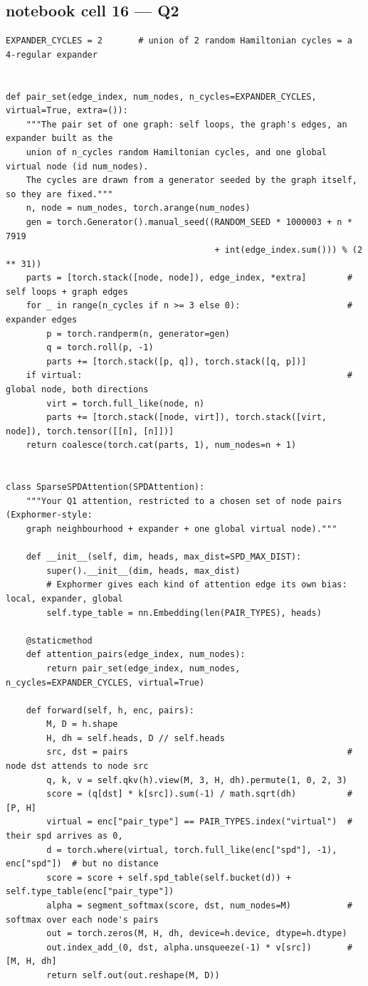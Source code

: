 \subsection*{notebook cell 16 — Q2}
\begin{lstlisting}[style=p1py]
EXPANDER_CYCLES = 2       # union of 2 random Hamiltonian cycles = a 4-regular expander


def pair_set(edge_index, num_nodes, n_cycles=EXPANDER_CYCLES, virtual=True, extra=()):
    """The pair set of one graph: self loops, the graph's edges, an expander built as the
    union of n_cycles random Hamiltonian cycles, and one global virtual node (id num_nodes).
    The cycles are drawn from a generator seeded by the graph itself, so they are fixed."""
    n, node = num_nodes, torch.arange(num_nodes)
    gen = torch.Generator().manual_seed((RANDOM_SEED * 1000003 + n * 7919
                                         + int(edge_index.sum())) % (2 ** 31))
    parts = [torch.stack([node, node]), edge_index, *extra]        # self loops + graph edges
    for _ in range(n_cycles if n >= 3 else 0):                     # expander edges
        p = torch.randperm(n, generator=gen)
        q = torch.roll(p, -1)
        parts += [torch.stack([p, q]), torch.stack([q, p])]
    if virtual:                                                    # global node, both directions
        virt = torch.full_like(node, n)
        parts += [torch.stack([node, virt]), torch.stack([virt, node]), torch.tensor([[n], [n]])]
    return coalesce(torch.cat(parts, 1), num_nodes=n + 1)


class SparseSPDAttention(SPDAttention):
    """Your Q1 attention, restricted to a chosen set of node pairs (Exphormer-style:
    graph neighbourhood + expander + one global virtual node)."""

    def __init__(self, dim, heads, max_dist=SPD_MAX_DIST):
        super().__init__(dim, heads, max_dist)
        # Exphormer gives each kind of attention edge its own bias: local, expander, global
        self.type_table = nn.Embedding(len(PAIR_TYPES), heads)

    @staticmethod
    def attention_pairs(edge_index, num_nodes):
        return pair_set(edge_index, num_nodes, n_cycles=EXPANDER_CYCLES, virtual=True)

    def forward(self, h, enc, pairs):
        M, D = h.shape
        H, dh = self.heads, D // self.heads
        src, dst = pairs                                           # node dst attends to node src
        q, k, v = self.qkv(h).view(M, 3, H, dh).permute(1, 0, 2, 3)
        score = (q[dst] * k[src]).sum(-1) / math.sqrt(dh)          # [P, H]
        virtual = enc["pair_type"] == PAIR_TYPES.index("virtual")  # their spd arrives as 0,
        d = torch.where(virtual, torch.full_like(enc["spd"], -1), enc["spd"])  # but no distance
        score = score + self.spd_table(self.bucket(d)) + self.type_table(enc["pair_type"])
        alpha = segment_softmax(score, dst, num_nodes=M)           # softmax over each node's pairs
        out = torch.zeros(M, H, dh, device=h.device, dtype=h.dtype)
        out.index_add_(0, dst, alpha.unsqueeze(-1) * v[src])       # [M, H, dh]
        return self.out(out.reshape(M, D))
\end{lstlisting}